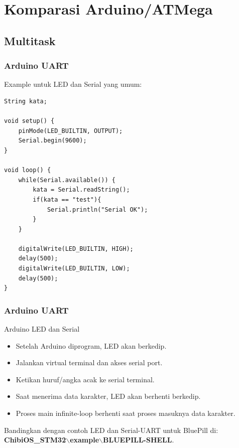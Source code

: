 \documentclass[table,dvipsnames]{beamer}
\begin{document}
	\section{Komparasi Arduino/ATMega}

	\subsection{Multitask}
	\begin{frame}[fragile]
		\frametitle{Arduino UART}
		\begin{exampleblock}{}
			Example untuk LED dan Serial yang umum:
			\begin{verbatim}
String kata;

void setup() {
	pinMode(LED_BUILTIN, OUTPUT);
	Serial.begin(9600);
}

void loop() {
	while(Serial.available()) {
		kata = Serial.readString();
		if(kata == "test"){
			Serial.println("Serial OK");
		}
	}

	digitalWrite(LED_BUILTIN, HIGH);
	delay(500);
	digitalWrite(LED_BUILTIN, LOW);
	delay(500);
}
			\end{verbatim}
		\end{exampleblock}
	\end{frame}

	\begin{frame}
		\frametitle{Arduino UART}
		\begin{exampleblock}{}
			Arduino LED dan Serial
			\begin{itemize}
				\item Setelah Arduino diprogram, LED akan berkedip.
				\item Jalankan virtual terminal dan akses serial port.
				\item Ketikan huruf/angka acak ke serial terminal.
				\item Saat menerima data karakter, LED akan berhenti berkedip.
				\item Proses main infinite-loop berhenti saat proses masuknya data karakter.
			\end{itemize}
		\end{exampleblock}

		\begin{exampleblock}{}
			Bandingkan dengan contoh LED dan Serial-UART untuk BluePill di:
			\textbf{ChibiOS\_STM32$\backslash$example$\backslash$BLUEPILL-SHELL}.
		\end{exampleblock}
	\end{frame}
\end{document}
